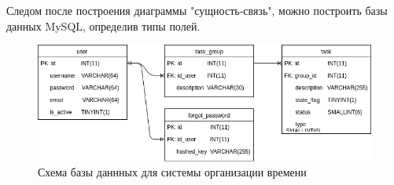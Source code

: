 Следом после построения диаграммы "сущность-связь", можно построить базы данных MySQL, определив типы полей.

\begin{figure}[ht]
\centering
  \includegraphics[scale=0.5]{images/mysql_schema.png}  
  \caption{ Схема базы даннных для системы организации времени }
  \label{fig:domain:todist}
\end{figure}